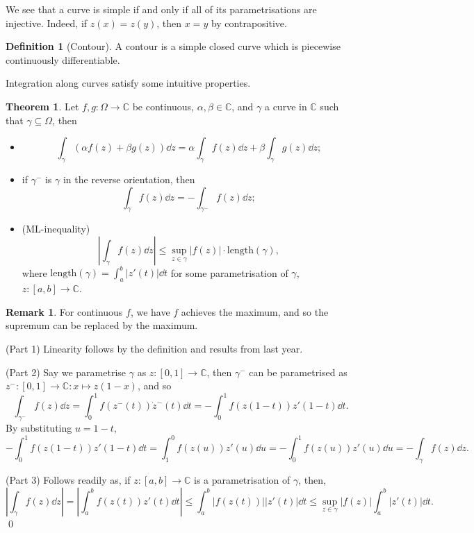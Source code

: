 \documentclass[
]{article}
\theoremstyle{definition}
\newtheorem{theorem}{Theorem}
\newtheorem*{remark}{Remark}
\theoremstyle{definition}
\newtheorem{definition}{Definition}[section]
\begin{document}
We see that a curve is simple if and only if all of its parametrisations
are injective. Indeed, if \(z(x) = z(y)\), then \(x = y\) by
contrapositive.

\begin{definition}[Contour]
  A contour is a simple closed curve which is piecewise continuously differentiable.
\end{definition}

Integration along curves satisfy some intuitive properties.

\begin{theorem}
  Let \(f, g : \Omega \to \mathbb{C}\) be continuous, \(\alpha, \beta \in \mathbb{C}\), 
  and \(\gamma\) a curve in \(\mathbb{C}\) such that \(\gamma \subseteq \Omega\), then 
  \begin{itemize}
    \item \[\int_\gamma (\alpha f(z) + \beta g(z)) \dd z 
      = \alpha \int_\gamma f(z) \dd z + \beta \int_\gamma g(z) \dd z;\]
    \item if \(\gamma^{-}\) is \(\gamma\) in the reverse orientation, then 
      \[\int_\gamma f(z) \dd z = - \int_{\gamma^-} f(z) \dd z;\]
    \item (ML-inequality)
      \[\left| \int_\gamma f(z) \dd z \right| \le 
        \sup_{z \in \gamma}|f(z)| \cdot \text{length}(\gamma),\]
      where \(\text{length}(\gamma) = \int_a^b |z'(t)| \dd t\) for some parametrisation 
      of \(\gamma\), \(z : [a, b] \to \mathbb{C}\).
  \end{itemize}
\end{theorem}
\begin{remark}
  For continuous \(f\), we have \(f\) achieves the maximum, and so the supremum 
  can be replaced by the maximum.
\end{remark}
\proof

(Part 1) Linearity follows by the definition and results from last year.

(Part 2) Say we parametrise \(\gamma\) as \(z : [0, 1] \to \mathbb{C}\),
then \(\gamma^-\) can be parametrised as
\(z^- : [0, 1] \to \mathbb{C} : x \mapsto z(1 - x)\), and so
\[\int_{\gamma^-}f(z) \dd z = \int_0^1 f(z^-(t)) \dot z^- (t) \dd t
    = - \int_0^1 f(z(1 - t)) z'(1 - t) \dd t.\] By substituting
\(u = 1 - t\),
\[- \int_0^1 f(z(1 - t)) z'(1 - t) \dd t = \int_1^0 f(z(u)) z'(u) \dd u
    = - \int_0^1 f(z(u))z'(u) \dd u = - \int_\gamma f(z) \dd z.\]

(Part 3) Follows readily as, if \(z : [a, b] \to \mathbb{C}\) is a
parametrisation of \(\gamma\), then,
\[\left| \int_\gamma f(z) \dd z \right| = \left| \int_a^b f(z(t)) z'(t) \dd t \right|
    \le \int_a^b |f(z(t))| |z'(t)| \dd t 
    \le \sup_{z \in \gamma}|f(z)| \int_a^b |z'(t)| \dd t.\] \qed
\end{document}

